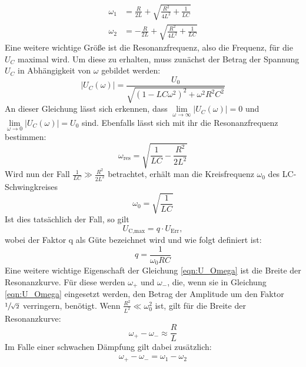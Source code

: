 \begin{align}
  \omega_1 &= \frac{R}{2L}+\sqrt{\frac{R^2}{4L^2}+\frac{1}{LC}}\\
  \omega_2 &= -\frac{R}{2L}+\sqrt{\frac{R^2}{4L^2}+\frac{1}{LC}}
  \label{eqn:omegas}
\end{align}
Eine weitere wichtige Größe ist die Resonanzfrequenz, also die Frequenz, für die $U_C$ maximal wird.
Um diese zu erhalten, muss zunächst der Betrag der Spannung $U_C$ in Abhängigkeit von $\omega$ gebildet werden:
\begin{equation}
  \lvert U_C(\omega)\rvert=\frac{U_0}{\sqrt{\left(1-LC\omega^2 \right)^2+\omega^2R^2C^2}}
\label{eqn:U_Omega}
\end{equation}
An dieser Gleichung lässt sich erkennen, dass $\underset{\omega \to \infty}{\lim} \lvert U_C(\omega)\rvert =0$
und $\underset{\omega \to 0}{\lim} \lvert U_C(\omega)\rvert=U_0$ sind. Ebenfalls lässt sich mit ihr die Resonanzfrequenz bestimmen:
\begin{equation}
  \omega_\text{res}=\sqrt{\frac{1}{LC}-\frac{R^2}{2L^2}}
  \label{eqn:ores}
\end{equation}
Wird nun der Fall $\frac{1}{LC} \gg \frac{R^2}{2L^2}$ betrachtet, erhält man die Kreisfrequenz $\omega_0$ des LC-Schwingkreises
\begin{equation}
  \omega_0=\sqrt{\frac{1}{LC}}
  \label{eqn:omega0}
\end{equation}
Ist dies tatsächlich der Fall, so gilt
\begin{equation}
  U_\text{C,max}=q \cdot U_\text{Err},
\end{equation}
wobei der Faktor q als Güte bezeichnet wird und wie folgt definiert ist:
\begin{equation}
  q=\frac{1}{\omega_0 RC}
  \label{eqn:q}
\end{equation}
Eine weitere wichtige Eigenschaft der Gleichung \eqref{eqn:U_Omega} ist die Breite der Resonanzkurve.
Für diese werden $\omega_+$ und $\omega_-$, die, wenn sie in Gleichung \eqref{eqn:U_Omega} eingesetzt werden, den Betrag
der Amplitude um den Faktor $\sfrac{1}{\sqrt{2}}$ verringern, benötigt.
Wenn $\frac{R^2}{L^2} \ll \omega^2_0$ ist, gilt für die Breite der Resonanzkurve:
\begin{equation}
  \omega_+ - \omega_- \approx \frac{R}{L}
  \label{eqn:bres}
\end{equation}
Im Falle einer schwachen Dämpfung gilt dabei zusätzlich:
\begin{align}
  \omega_+ - \omega_- = \omega_1 - \omega_2
\end{align}
